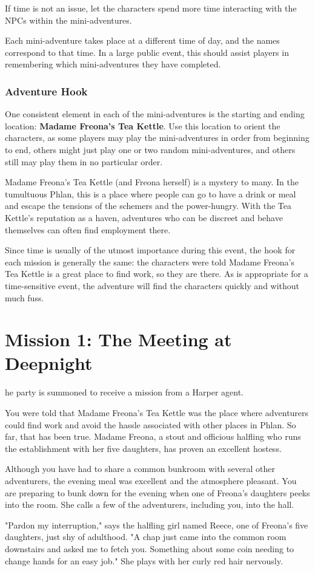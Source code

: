 \documentclass[10pt,a4paper,twoside,bg=print,twocolumn,openany,nodeprecatedcode]{dndbook}
\begin{document}
If time is not an issue, let the characters spend more time interacting with the NPCs within the mini-adventures.

Each mini-adventure takes place at a different time of day, and the names correspond to that time. In a large public event, this should assist players in remembering which mini-adventures they have completed.

\subsection{Adventure Hook}
One consistent element in each of the mini-adventures is the starting and ending location: \textbf{Madame Freona's Tea Kettle}. Use this location to orient the characters, as some players may play the mini-adventures in order from beginning to end, others might just play one or two random mini-adventures, and others still may play them in no particular order.

Madame Freona's Tea Kettle (and Freona herself) is a mystery to many. In the tumultuous Phlan, this is a place where people can go to have a drink or meal and escape the tensions of the schemers and the power-hungry. With the Tea Kettle's reputation as a haven, adventures who can be discreet and behave themselves can often find employment there.

Since time is usually of the utmost importance during this event, the hook for each mission is generally the same: the characters were told Madame Freona's Tea Kettle is a great place to find work, so they are there. As is appropriate for a time-sensitive event, the adventure will find the characters quickly and without much fuss.

\chapter{Mission 1: The Meeting at Deepnight}
he party is summoned to receive a mission from a Harper agent.


\begin{DndReadAloud}{}
You were told that Madame Freona's Tea Kettle was the place where adventurers could find work and avoid the hassle associated with other places in Phlan. So far, that has been true. Madame Freona, a stout and officious halfling who runs the establishment with her five daughters, has proven an excellent hostess.

Although you have had to share a common bunkroom with several other adventurers, the evening meal was excellent and the atmosphere pleasant. You are preparing to bunk down for the evening when one of Freona's daughters peeks into the room. She calls a few of the adventurers, including you, into the hall.

"Pardon my interruption," says the halfling girl named Reece, one of Freona's five daughters, just shy of adulthood. "A chap just came into the common room downstairs and asked me to fetch you. Something about some coin needing to change hands for an easy job." She plays with her curly red hair nervously.

\end{DndReadAloud}
\end{document}
